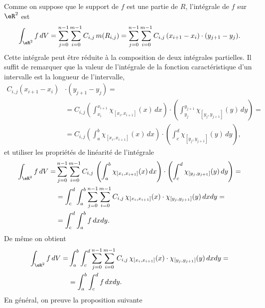 Comme on suppose que le support de $f$ est une partie de $R$, l'intégrale de $f$ sur $\eR^2$ est
\begin{equation}
  \begin{aligned}
\int_{\eR^2}f \,dV = \sum_{j=0}^{n-1}\sum_{i=0}^{m-1}C_{i,j}\,m(R_{i,j})=\sum_{j=0}^{n-1}\sum_{i=0}^{m-1}C_{i,j}\,(x_{i+1}-x_i)\cdot(y_{j+1}-y_j).
 \end{aligned}
\end{equation} 
Cette intégrale peut être réduite à la composition de deux intégrales partielles. Il suffit de remarquer que la valeur de l'intégrale de la fonction caractéristique d'un intervalle est la longueur de l'intervalle, 
\begin{equation}
  \begin{aligned}
    C_{i,j}(x_{i+1}-x_i)&\cdot(y_{j+1}-y_j)=\\
&=C_{i,j}\left(\int_{x_i}^{x_{i+1}}\chi_{[x_{i},x_{i+1}]}(x)\, dx \right)\cdot \left(\int_{y_j}^{y_{j+1}}\chi_{[y_{ j},y_{ j+1}]}(y)\, dy \right)=\\
&=C_{i,j}\left(\int_{a}^{b}\chi_{[x_{i},x_{i+1}]}(x)\, dx \right)\cdot \left(\int_{c}^{d}\chi_{[y_{ j},y_{ j+1}]}(y)\, dy \right),
  \end{aligned}
\end{equation}
et utiliser les propriétés de linéarité de l'intégrale
\begin{equation}
  \begin{aligned}
   \int_{\eR^2}f \,dV =& \sum_{j=0}^{n-1}\sum_{i=0}^{m-1}C_{i,j}\,\left(\int_{a}^{b}\chi_{[x_{i},x_{i+1}]}(x)\, dx \right)\cdot \left(\int_{c}^{d}\chi_{[y_{ j},y_{ j+1}]}(y)\, dy \right)=\\
&=\int_{c}^{d}\int_{a}^{b}\sum_{j=0}^{n-1}\sum_{i=0}^{m-1}C_{i,j}\,\chi_{[x_{i},x_{i+1}]}(x)\cdot \chi_{[y_{ j},y_{ j+1}]}(y)\, dx dy=\\
&=\int_{c}^{d}\int_{a}^{b} f\, dx dy.  
  \end{aligned}
\end{equation}
De même on obtient
\begin{equation}
  \begin{aligned}
   \int_{\eR^2}f \,dV =&\int_{a}^{b}\int_{c}^{d}\sum_{j=0}^{n-1}\sum_{i=0}^{m-1}C_{i,j}\,\chi_{[x_{i},x_{i+1}]}(x)\cdot \chi_{[y_{ j},y_{ j+1}]}(y)\, dx dy=\\
&=\int_{a}^{b}\int_{c}^{d} f\, dx dy.  
  \end{aligned}
\end{equation}
En général, on preuve la proposition suivante
